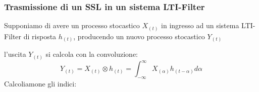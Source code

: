         \subsubsection{Trasmissione di un SSL in un sistema LTI-Filter}
            Supponiamo di avere un processo stocastico $X_{(t)}$ in ingresso ad un sistema LTI-Filter di risposta $h_{(t)}$,
            producendo un nuovo processo stocastico $Y_{(t)}$
            \begin{figure}[H]
                \centering
            \end{figure}
            l'uscita $Y_{(t)}$ si calcola con la convoluzione:
            \[
                Y_{(t)} = X_{(t)} \otimes h_{(t)} = \int_{-\infty}^{\infty} X_{(\alpha)} h_{(t-\alpha)} d\alpha
            \]
            Calcoliamone gli indici:
